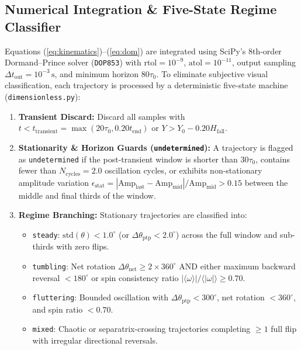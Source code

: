 \documentclass[10pt,a4paper,twocolumn]{article}
\begin{document}
\subsection{Numerical Integration & Five-State Regime Classifier}
Equations (\ref{eq:kinematics})--(\ref{eq:dom}) are integrated using SciPy's 8th-order Dormand--Prince solver (\texttt{DOP853}) with $\mathrm{rtol} = 10^{-9}$, $\mathrm{atol} = 10^{-11}$, output sampling $\Delta t_{\mathrm{out}} = 10^{-3}\,\mathrm{s}$, and minimum horizon $80\tau_0$. To eliminate subjective visual classification, each trajectory is processed by a deterministic five-state machine (\texttt{dimensionless.py}):
\begin{enumerate}
    \item \textbf{Transient Discard:} Discard all samples with $t < t_{\mathrm{transient}} = \max(20\tau_0, 0.20 t_{\mathrm{end}})$ or $Y > Y_0 - 0.20 H_{\mathrm{fall}}$.
    \item \textbf{Stationarity & Horizon Guards (\texttt{undetermined}):} A trajectory is flagged as \texttt{undetermined} if the post-transient window is shorter than $30\tau_0$, contains fewer than $N_{\mathrm{cycles}} = 2.0$ oscillation cycles, or exhibits non-stationary amplitude variation $\epsilon_{\mathrm{stat}} = |\mathrm{Amp}_{\mathrm{last}} - \mathrm{Amp}_{\mathrm{mid}}| / \mathrm{Amp}_{\mathrm{mid}} > 0.15$ between the middle and final thirds of the window.
    \item \textbf{Regime Branching:} Stationary trajectories are classified into:
    \begin{itemize}
        \item \texttt{steady}: $\mathrm{std}(\theta) < 1.0^\circ$ (or $\Delta\theta_{\mathrm{ptp}} < 2.0^\circ$) across the full window and sub-thirds with zero flips.
        \item \texttt{tumbling}: Net rotation $\Delta\theta_{\mathrm{net}} \ge 2 \times 360^\circ$ AND either maximum backward reversal $< 180^\circ$ or spin consistency ratio $|\langle\omega\rangle|/\langle|\omega|\rangle \ge 0.70$.
        \item \texttt{fluttering}: Bounded oscillation with $\Delta\theta_{\mathrm{ptp}} < 300^\circ$, net rotation $< 360^\circ$, and spin ratio $< 0.70$.
        \item \texttt{mixed}: Chaotic or separatrix-crossing trajectories completing $\ge 1$ full flip with irregular directional reversals.
    \end{itemize}
\end{enumerate}
\end{document}
